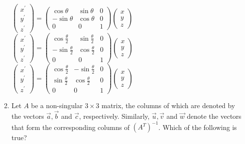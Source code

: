 \begin{enumerate}[label=\color{ocre}\textbf{\arabic*.}]
\begin{tasks}
		\task[\textbf{B.}] $\left(\begin{array}{l}x^{\prime} \\ y^{\prime} \\ z^{\prime}\end{array}\right)=\left(\begin{array}{ccc}\cos \theta & \sin \theta & 0 \\ -\sin \theta & \cos \theta & 0 \\ 0 & 0 & 1\end{array}\right)\left(\begin{array}{l}x \\ y \\ z\end{array}\right)$
		\task[\textbf{C.}] $\left(\begin{array}{l}x^{\prime} \\ y^{\prime} \\ z^{\prime}\end{array}\right)=\left(\begin{array}{ccc}\cos \frac{\theta}{2} & \sin \frac{\theta}{2} & 0 \\ -\sin \frac{\theta}{2} & \cos \frac{\theta}{2} & 0 \\ 0 & 0 & 1\end{array}\right)\left(\begin{array}{l}x \\ y \\ z\end{array}\right)$
		\task[\textbf{D.}] $\left(\begin{array}{l}x^{\prime} \\ y^{\prime} \\ z^{\prime}\end{array}\right)=\left(\begin{array}{ccc}\cos \frac{\theta}{2} & -\sin \frac{\theta}{2} & 0 \\ \sin \frac{\theta}{2} & \cos \frac{\theta}{2} & 0 \\ 0 & 0 & 1\end{array}\right)\left(\begin{array}{l}x \\ y \\ z\end{array}\right)$
	\end{tasks}
	\item  Let $A$ be a non-singular $3 \times 3$ matrix, the columns of which are denoted by the vectors $\vec{a}, \vec{b}$ and $\vec{c}$, respectively. Similarly, $\vec{u}, \vec{v}$ and $\vec{w}$ denote the vectors that form the corresponding columns of $\left(A^{T}\right)^{-1}$. Which of the following is true?

\end{enumerate}
